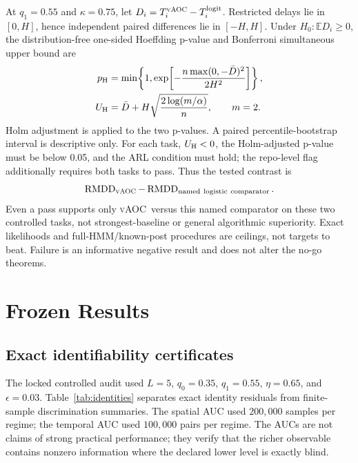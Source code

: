 \documentclass[letterpaper,journal]{IEEEtran}
\newcommand{\E}{\mathbb E}
\newcommand{\vAOC}{\textsc{vAOC}}
\begin{document}
At $q_1=0.55$ and $\kappa=0.75$, let
$D_i=T_i^{\vAOC}-T_i^{\rm logit}$. Restricted delays lie in $[0,H]$, hence
independent paired differences lie in $[-H,H]$. Under
$H_0:\E D_i\geq0$, the distribution-free one-sided Hoeffding p-value and
Bonferroni simultaneous upper bound are
\begin{align}
p_{\rm H}
&=\min\!\left\{1,\exp\!\left[
-\frac{n\max(0,-\bar D)^2}{2H^2}\right]\right\},\\
U_{\rm H}
&=\bar D+H\sqrt{\frac{2\log(m/\alpha)}{n}},\qquad m=2.
\label{eq:named-comparison}
\end{align}
Holm adjustment is applied to the two p-values. A paired percentile-bootstrap
interval is descriptive only. For each task, $U_{\rm H}<0$, the
Holm-adjusted p-value must be below 0.05, and the ARL condition must hold; the
repo-level flag additionally requires both tasks to pass. Thus the tested
contrast is
\begin{equation}
\operatorname{RMDD}_{\vAOC}
-\operatorname{RMDD}_{\mathrm{named\ logistic\ comparator}}.
\label{eq:comparison-estimand}
\end{equation}
Even a pass supports only \vAOC\ versus this named comparator on these two
controlled tasks, not strongest-baseline or general algorithmic superiority.
Exact likelihoods and full-HMM/known-post procedures are ceilings, not
targets to beat. Failure is an informative negative result and does not alter
the no-go theorems.

\section{Frozen Results}

\subsection{Exact identifiability certificates}

The locked controlled audit used $L=5$, $q_0=0.35$, $q_1=0.55$,
$\eta=0.65$, and $\epsilon=0.03$. Table~\ref{tab:identities} separates exact
identity residuals from finite-sample discrimination summaries. The spatial
AUC used $200{,}000$ samples per regime; the temporal AUC used $100{,}000$
pairs per regime. The AUCs are not claims of strong practical performance;
they verify that the richer observable contains nonzero information where
the declared lower level is exactly blind.
\end{document}

